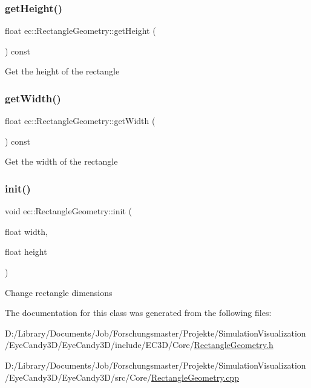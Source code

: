 \subsubsection{\texorpdfstring{get\+Height()}{getHeight()}}
{\footnotesize\ttfamily float ec\+::\+Rectangle\+Geometry\+::get\+Height (\begin{DoxyParamCaption}{ }\end{DoxyParamCaption}) const}

Get the height of the rectangle \mbox{\label{classec_1_1_rectangle_geometry_a1f75cd7d531e23fe3ccaff67178e0a08}} 
\subsubsection{\texorpdfstring{get\+Width()}{getWidth()}}
{\footnotesize\ttfamily float ec\+::\+Rectangle\+Geometry\+::get\+Width (\begin{DoxyParamCaption}{ }\end{DoxyParamCaption}) const}

Get the width of the rectangle \mbox{\label{classec_1_1_rectangle_geometry_ac6dd804a2fa2b253b71408dae5a08265}} 
\subsubsection{\texorpdfstring{init()}{init()}}
{\footnotesize\ttfamily void ec\+::\+Rectangle\+Geometry\+::init (\begin{DoxyParamCaption}\item[{float}]{width,  }\item[{float}]{height }\end{DoxyParamCaption})}

Change rectangle dimensions 

The documentation for this class was generated from the following files\+:\begin{DoxyCompactItemize}
\item 
D\+:/\+Library/\+Documents/\+Job/\+Forschungsmaster/\+Projekte/\+Simulation\+Visualization/\+Eye\+Candy3\+D/\+Eye\+Candy3\+D/include/\+E\+C3\+D/\+Core/\mbox{\hyperlink{_rectangle_geometry_8h}{Rectangle\+Geometry.\+h}}\item 
D\+:/\+Library/\+Documents/\+Job/\+Forschungsmaster/\+Projekte/\+Simulation\+Visualization/\+Eye\+Candy3\+D/\+Eye\+Candy3\+D/src/\+Core/\mbox{\hyperlink{_rectangle_geometry_8cpp}{Rectangle\+Geometry.\+cpp}}\end{DoxyCompactItemize}
